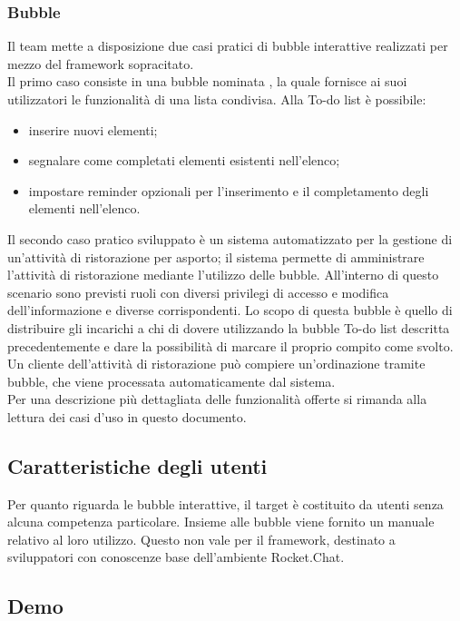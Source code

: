 \subsubsection{Bubble}
Il team \GroupName{} mette a disposizione due casi pratici di bubble interattive realizzati per mezzo del framework sopracitato.\\
Il primo caso consiste in una bubble nominata , la quale fornisce ai suoi utilizzatori le funzionalità di una lista condivisa. Alla To-do list è possibile:
\begin{itemize}
	\item inserire nuovi elementi;
	\item segnalare come completati elementi esistenti nell'elenco;
	\item impostare reminder opzionali per l'inserimento e il completamento degli elementi nell'elenco.
\end{itemize}
Il secondo caso pratico sviluppato è un sistema automatizzato per la gestione di un'attività di ristorazione per asporto; il sistema permette di amministrare l'attività di ristorazione mediante l'utilizzo delle bubble. All'interno di questo scenario sono previsti ruoli con diversi privilegi di accesso e modifica dell'informazione e diverse  corrispondenti.
Lo scopo di questa bubble è quello di distribuire gli incarichi a chi di dovere utilizzando la bubble To-do list descritta precedentemente e dare la possibilità di marcare il proprio compito come svolto.\\
Un cliente dell'attività di ristorazione può compiere un'ordinazione tramite bubble, che viene processata automaticamente dal sistema.\\
Per una descrizione più dettagliata delle funzionalità offerte si rimanda alla lettura dei casi d'uso in questo documento.

\subsection{Caratteristiche degli utenti}
Per quanto riguarda le bubble interattive, il target è costituito da utenti senza alcuna competenza particolare. Insieme alle bubble viene fornito un manuale relativo al loro utilizzo. Questo non vale per il framework, destinato a sviluppatori con conoscenze base dell'ambiente Rocket.Chat.

\subsection{Demo}

